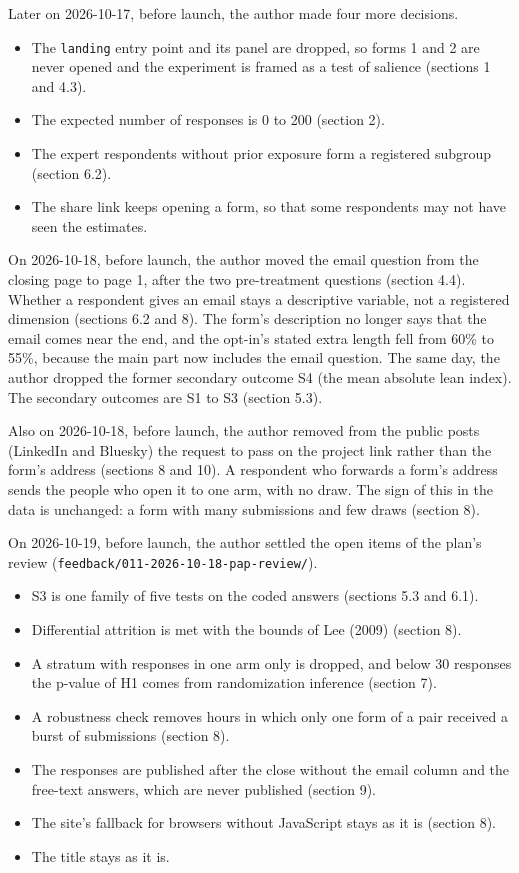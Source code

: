 Later on 2026-10-17, before launch, the author made four more decisions.

\begin{itemize}
\tightlist
\item
  The \texttt{landing} entry point and its panel are dropped, so forms 1 and 2 are never opened and the
  experiment is framed as a test of salience (sections 1 and 4.3).
\item
  The expected number of responses is 0 to 200 (section 2).
\item
  The expert respondents without prior exposure form a registered subgroup (section 6.2).
\item
  The share link keeps opening a form, so that some respondents may not have seen the estimates.
\end{itemize}

On 2026-10-18, before launch, the author moved the email question from the closing page to page 1,
after the two pre-treatment questions (section 4.4). Whether a respondent gives an email stays a
descriptive variable, not a registered dimension (sections 6.2 and 8). The form's description no longer says that the email comes near the end, and the opt-in's stated extra length
fell from 60\% to 55\%, because the main part now includes the email question. The same day,
the author dropped the former secondary outcome S4 (the mean absolute lean index). The secondary
outcomes are S1 to S3 (section 5.3).

Also on 2026-10-18, before launch, the author removed from the public posts (LinkedIn and Bluesky)
the request to pass on the project link rather than the form's address (sections 8 and 10). A
respondent who forwards a form's address sends the people who open it to one arm, with no draw.
The sign of this in the data is unchanged: a form with many submissions and few draws
(section 8).

On 2026-10-19, before launch, the author settled the open items of the plan's review
(\texttt{feedback/011-2026-10-18-pap-review/}).

\begin{itemize}
\tightlist
\item
  S3 is one family of five tests on the coded answers (sections 5.3 and 6.1).
\item
  Differential attrition is met with the bounds of Lee (2009) (section 8).
\item
  A stratum with responses in one arm only is dropped, and below 30 responses the p-value of H1
  comes from randomization inference (section 7).
\item
  A robustness check removes hours in which only one form of a pair received a burst of
  submissions (section 8).
\item
  The responses are published after the close without the email column and the free-text
  answers, which are never published (section 9).
\item
  The site's fallback for browsers without JavaScript stays as it is (section 8).
\item
  The title stays as it is.
\end{itemize}

